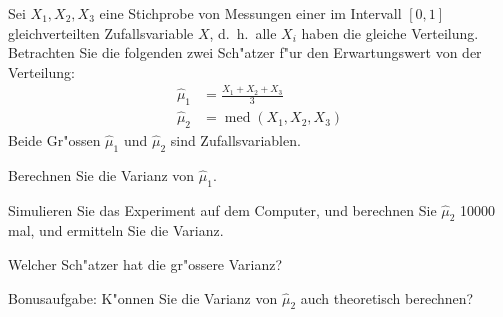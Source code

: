 Sei $X_1,X_2,X_3$ eine Stichprobe von Messungen einer im
Intervall $[0,1]$ gleichverteilten Zufallsvariable $X$,
d.~h.~alle $X_i$ haben die gleiche Verteilung. Betrachten Sie die folgenden
zwei Sch"atzer f"ur den Erwartungswert von der Verteilung:
\begin{align*}
\hat\mu_1&=\frac{X_1+X_2+X_3}3\\
\hat\mu_2&=\operatorname{med}(X_1,X_2,X_3)
\end{align*}
Beide Gr"ossen $\hat\mu_1$ und $\hat\mu_2$ sind Zufallsvariablen.
\begin{teilaufgaben}
\item
Berechnen Sie die Varianz von $\hat\mu_1$.
\item
Simulieren Sie das Experiment auf dem Computer, und berechnen Sie
$\hat\mu_2$ 10000 mal, und ermitteln Sie die Varianz.
\item
Welcher Sch"atzer hat die gr"ossere Varianz?
\item
Bonusaufgabe:
K"onnen Sie die Varianz von $\hat\mu_2$ auch theoretisch
berechnen?
\end{teilaufgaben}

